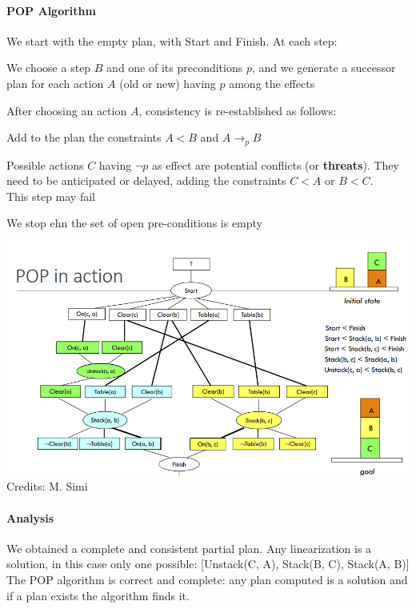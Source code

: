 \documentclass[10pt]{report}
\begin{document}
\paragraph{POP Algorithm} We start with the empty plan, with Start and Finish. At each step:
\begin{list}{}{}
	\item We choose a step $B$ and one of its preconditions $p$, and we generate a successor plan for each action $A$ (old or new) having $p$ among the effects
	\item After choosing an action $A$, consistency is re-established as follows:
	\begin{list}{}{}
		\item Add to the plan the constraints $A<B$ and $A\rightarrow_p B$
		\item Possible actions $C$ having $\neg p$ as effect are potential conflicts (or \textbf{threats}). They need to be anticipated or delayed, adding the constraints $C< A$ or $B < C$.\\
		This step may fail
	\end{list}
	\item We stop ehn the set of open pre-conditions is empty
\end{list}
\begin{center}
	\includegraphics[scale=0.65]{29.png}\\
	Credits: M. Simi
\end{center}
\paragraph{Analysis} We obtained a complete and consistent partial plan. Any linearization is a solution, in this case only one possible: [Unstack(C, A), Stack(B, C), Stack(A, B)]\\
The POP algorithm is correct and complete: any plan computed is a solution and if a plan exists the algorithm finds it.
\end{document}
